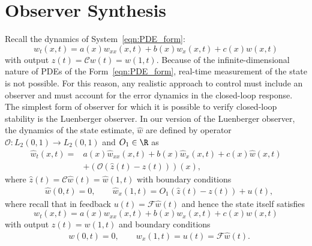 \documentclass[9pt,journal,twocolumn]{IEEEtran}
\newcommand{\wh}{\hat{w}}
\newcommand{\lt}{L_2(0,1)}
\begin{document}
\section{Observer Synthesis}\label{obsynth}
Recall the dynamics of System~\eqref{eqn:PDE_form}:
\begin{equation}
 w_t(x,t)=a(x)w_{xx}(x,t)+b(x)w_x(x,t)+c(x)w(x,t)
\end{equation}
with output $z(t)=\mathcal{C}w(t) = w(1,t)$. Because of the infinite-dimensional nature of PDEs of the Form~\eqref{eqn:PDE_form}, real-time measurement of the state is not possible. For this reason, any realistic approach to control must include an observer and must account for the error dynamics in the closed-loop response. The simplest form of observer for which it is possible to verify closed-loop stability is the Luenberger observer. In our version of the Luenberger observer, the dynamics of the state estimate, $\hat w$ are defined by operator $\mathcal{O}:\lt \rightarrow \lt$ and $O_1 \in \R$ as
\begin{align}
 \wh_t(x,t)=&a(x)\wh_{xx}(x,t)+b(x)\wh_x(x,t)+c(x)\wh(x,t) \nonumber \\
 &\label{eqn:obs_coupled_1}+(\mathcal{O}(\hat{z}(t)-z(t)))(x),
\end{align}
where $\hat z(t)=\mathcal{C}\wh(t)=\wh(1,t)$ with boundary conditions
\begin{align}
 &\label{eqn:obs_coupled_BC_1}\wh(0,t)=0, \qquad \wh_x(1,t)=O_1 (\hat{z}(t)-z(t))+u(t),
\end{align} 
where recall that in feedback $u(t)=\mathcal{F}\wh(t)$ and hence the state itself satisfies
\begin{equation}
 w_t(x,t)\label{eqn:obs_coupled_2}=a(x)w_{xx}(x,t)+b(x)w_x(x,t)+c(x)w(x,t)
\end{equation}
with output $z(t) = w(1,t)$ and boundary conditions \begin{align}
 &\label{eqn:obs_coupled_BC_2}w(0,t)=0, \qquad w_x(1,t)=u(t)=\mathcal{F}\wh(t).
\end{align}
\end{document}
